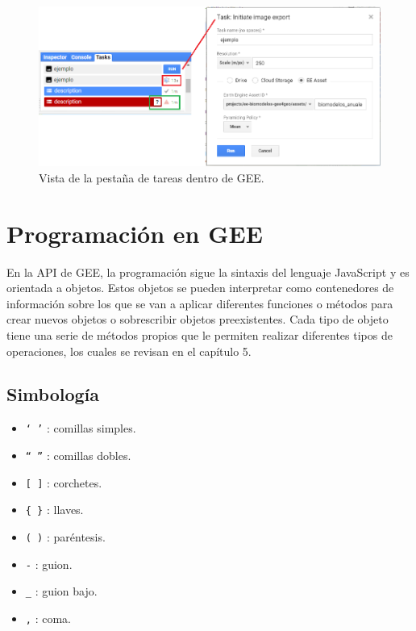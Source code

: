 \documentclass[
  12pt,
  letterpaper,
  twoside]{book}
\providecommand{\tightlist}{%
  \setlength{\itemsep}{0pt}\setlength{\parskip}{0pt}}
\begin{document}
\begin{figure}[H]

{\centering \includegraphics[width=0.95\linewidth]{Img/task} 

}

\caption{Vista de la pestaña de tareas dentro de GEE.}\label{fig:f221}
\end{figure}

\hypertarget{programaciuxf3n-en-gee}{%
\section{Programación en GEE}\label{programaciuxf3n-en-gee}}

En la API de GEE, la programación sigue la sintaxis del lenguaje JavaScript y es orientada a objetos. Estos objetos se pueden interpretar como contenedores de información sobre los que se van a aplicar diferentes funciones o métodos para crear nuevos objetos o sobrescribir objetos preexistentes. Cada tipo de objeto tiene una serie de métodos propios que le permiten realizar diferentes tipos de operaciones, los cuales se revisan en el capítulo 5.

\hypertarget{simbologuxeda}{%
\subsection*{Simbología}\label{simbologuxeda}}

\begin{itemize}
\tightlist
\item
  \texttt{‘\ ’} : comillas simples.
\item
  \texttt{“\ ”} : comillas dobles.
\item
  \texttt{{[}\ {]}} : corchetes.
\item
  \texttt{\{\ \}} : llaves.
\item
  \texttt{(\ )} : paréntesis.
\item
  \texttt{-} : guion.
\item
  \texttt{\_} : guion bajo.
\item
  \texttt{,} : coma.
\end{itemize}
\end{document}
